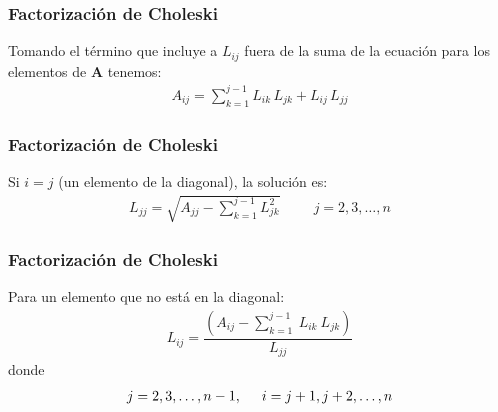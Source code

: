 \begin{frame}
\frametitle{Factorización de Choleski}
Tomando el término que incluye a $L_{ij}$ fuera de la suma de la ecuación para los elementos de $\mathbf{A}$ tenemos:
\begin{align*}
A_{ij} = \sum_{k=1}^{j-1} L_{ik} \, L_{jk} + L_{ij} \, L_{jj}
\end{align*}
\end{frame}
\begin{frame}
\frametitle{Factorización de Choleski}
Si $i = j$ (un elemento de la diagonal), la solución es:
\begin{align*}
L_{jj} = \sqrt{A_{jj} - \sum_{k=1}^{j-1} L_{jk}^{2}} \hspace{1cm} j = 2, 3, \ldots, n
\end{align*}
\end{frame}
\begin{frame}
\frametitle{Factorización de Choleski}
Para un elemento que no está en la diagonal:
\begin{align*}
 L_{ij} = \dfrac{\left( A_{ij} - \sum\limits_{k = 1}^{j-1} \: L_{ik} \: L_{jk} \right)}{L_{jj}}
\end{align*}
donde
\begin{align*}
j =2, 3, \ldots, n-1, \hspace{0.5cm} i = j+1, j+2, \ldots, n
\end{align*}
\end{frame}
